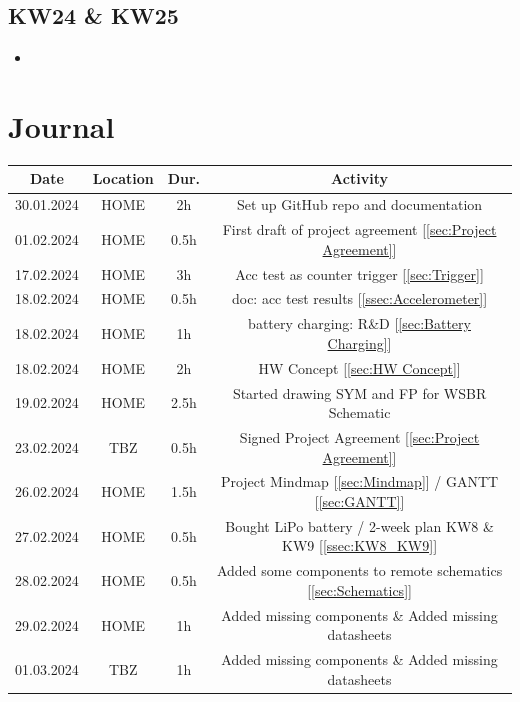 \subsection{KW24 \& KW25}
\label{ssec:KW24_KW25}
\begin{itemize}
    \item 
\end{itemize}
\newpage




\section{Journal}
\label{sec:Journal}
\begin{table}[H]
    \centering
\begin{tabular}{||c | c | c || c||} 
 \hline
 Date &  Location & Dur. & Activity \\ [0.5ex] 
 \hline\hline
    30.01.2024 & HOME & 2h & Set up GitHub repo and documentation \\   
 \hline
    01.02.2024 & HOME & 0.5h & First draft of project agreement [\ref{sec:Project Agreement}] \\ 
 \hline
    17.02.2024 & HOME & 3h & Acc test as counter trigger [\ref{sec:Trigger}] \\ 
 \hline
    18.02.2024 & HOME & 0.5h & doc: acc test results [\ref{ssec:Accelerometer}] \\ 
 \hline
    18.02.2024 & HOME & 1h & battery charging: R\&D [\ref{sec:Battery Charging}] \\ 
 \hline
    18.02.2024 & HOME & 2h & HW Concept [\ref{sec:HW Concept}] \\ 
 \hline
    19.02.2024 & HOME & 2.5h & Started drawing SYM and FP for WSBR Schematic \\ 
 \hline
    23.02.2024 & TBZ & 0.5h & Signed Project Agreement [\ref{sec:Project Agreement}] \\ 
 \hline
    26.02.2024 & HOME & 1.5h & Project Mindmap [\ref{sec:Mindmap}] / GANTT [\ref{sec:GANTT}] \\ 
 \hline
    27.02.2024 & HOME & 0.5h & Bought LiPo battery / 2-week plan KW8 \& KW9 [\ref{ssec:KW8_KW9}] \\ 
 \hline
    28.02.2024 & HOME & 0.5h & Added some components to remote schematics [\ref{sec:Schematics}] \\ 
 \hline
    29.02.2024 & HOME & 1h & Added missing components \& Added missing datasheets \\ 
 \hline
    01.03.2024 & TBZ & 1h & Added missing components \& Added missing datasheets \\ 

\end{tabular}
\end{table}
